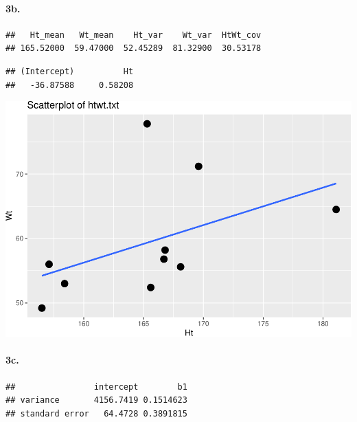\documentclass[]{article}
\newenvironment{Shaded}{\begin{snugshade}}{\end{snugshade}}
\newcommand{\KeywordTok}[1]{\textcolor[rgb]{0.13,0.29,0.53}{\textbf{#1}}}
\newcommand{\DecValTok}[1]{\textcolor[rgb]{0.00,0.00,0.81}{#1}}
\newcommand{\StringTok}[1]{\textcolor[rgb]{0.31,0.60,0.02}{#1}}
\newcommand{\CommentTok}[1]{\textcolor[rgb]{0.56,0.35,0.01}{\textit{#1}}}
\newcommand{\OperatorTok}[1]{\textcolor[rgb]{0.81,0.36,0.00}{\textbf{#1}}}
\newcommand{\NormalTok}[1]{#1}
\let\oldparagraph\paragraph
\renewcommand{\paragraph}[1]{\oldparagraph{#1}\mbox{}}
\begin{document}
\paragraph{3b.}\label{b.}

\begin{verbatim}
##   Ht_mean   Wt_mean    Ht_var    Wt_var  HtWt_cov 
## 165.52000  59.47000  52.45289  81.32900  30.53178
\end{verbatim}

\begin{verbatim}
## (Intercept)          Ht 
##   -36.87588     0.58208
\end{verbatim}

\includegraphics{Assignment_1_files/figure-latex/unnamed-chunk-5-1.pdf}

\paragraph{3c.}\label{c.}

\begin{verbatim}
##                intercept        b1
## variance       4156.7419 0.1514623
## standard error   64.4728 0.3891815
\end{verbatim}

\begin{Shaded}
\end{Shaded}
\end{document}
